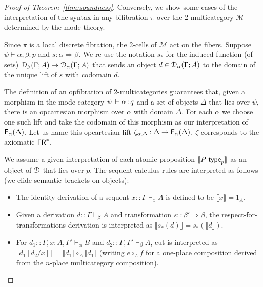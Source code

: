 \documentclass[a4paper,USenglish,numberwithinsect]{lipics-v2016}
\newcommand\spr{\ensuremath{\Rightarrow}} %
\newcommand\seq[3]{\ensuremath{#1 \vdash_{#2} #3}}
\newcommand\F[2]{\ensuremath{\dsd{F}_{#1}(#2)}}
\newcommand\wftype[2]{\ensuremath{#1 \,\, \dsd{type}_{#2}}}
\renewcommand{\oftp}[3]{\ensuremath{#1 \, \vdash #2 \, \dcd{:} \, #3}}
\newcommand\FR{\dsd{FR}}
\def\M{\mathcal{M}}
\def\llb{\llbracket}
\def\rrb{\rrbracket}
\begin{document}
\begin{proof}[Proof of Theorem~\ref{thm:soundness}]

Conversely, we show some cases of the interpretation of the syntax in
any bifibration $\pi$ over the 2-multicategory $\M$ determined by the
mode theory.

Since $\pi$ is a local discrete fibration, the 2-cells of $\M$ act on
the fibers. Suppose $\psi \vdash \alpha, \beta : p$ and $s : \alpha \spr
\beta$. We re-use the notation $s_*$ for the induced function (of sets)
$\mathcal{D}_\beta(\Gamma; A) \to \mathcal{D}_\alpha(\Gamma; A)$ that sends an object $d
\in \mathcal{D}_\alpha(\Gamma; A)$ to the domain of the unique lift of $s$ with
codomain $d$.

The definition of an opfibration of 2-multicategories guarantees that,
given a morphism in the mode category $\oftp{\psi}{\alpha}{q}$ and a set
of objects $\Delta$ that lies over $\psi$, there is an opcartesian
morphism over $\alpha$ with domain $\Delta$. For each $\alpha$ we choose
one such lift and take the codomain of this morphism as our
interpretation of $\F{\alpha}{\Delta}$. Let us name this opcartesian
lift $\zeta_{\alpha, \Delta} : \Delta \to \F{\alpha}{\Delta}$. $\zeta$
corresponds to the axiomatic $\FR^*$.

We assume a given interpretation of each atomic proposition $\llb
\wftype{P}{p} \rrb$ as an object of $\mathcal{D}$ that lies over $p$.  The
sequent calculus rules are interpreted as follows (we elide semantic
brackets on objects):

\begin{itemize}
\item The identity derivation of a sequent $x :: \seq{\Gamma}{x}{A}$ is
  defined to be $\llb x \rrb = 1_A$.

\item Given a derivation $d :: \seq{\Gamma}{\beta}{A}$ and
  transformation $s :: \beta' \spr \beta$, the
  respect-for-transformations derivation is interpreted as $\llb s_*(d)
  \rrb = s_*(\llb d \rrb)$.

\item For $d_1 :: \seq{\Gamma, x : A, \Gamma'}{\alpha}{B}$
  and $d_2 :: \seq{\Gamma, \Gamma'}{\beta}{A}$, cut is interpreted as
  $\llb d_1[d_2/x] \rrb = \llb d_1 \rrb \circ_A \llb d_1 \rrb$ (writing
  $e \circ_A f$ for a one-place composition derived from the $n$-place
  multicategory composition).


\end{itemize}
\end{proof}
\end{document}
